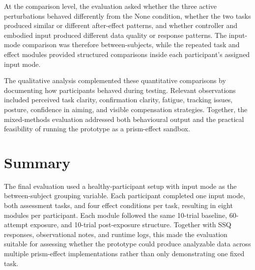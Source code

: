 At the comparison level, the evaluation asked whether the three active perturbations behaved differently from the None condition, whether the two tasks produced similar or different after-effect patterns, and whether controller and embodied input produced different data quality or response patterns. The input-mode comparison was therefore between-subjects, while the repeated task and effect modules provided structured comparisons inside each participant's assigned input mode.

The qualitative analysis complemented these quantitative comparisons by documenting how participants behaved during testing. Relevant observations included perceived task clarity, confirmation clarity, fatigue, tracking issues, posture, confidence in aiming, and visible compensation strategies. Together, the mixed-methods evaluation addressed both behavioural output and the practical feasibility of running the prototype as a prism-effect sandbox.

\section{Summary}
\label{sec:evaluation-summary}

The final evaluation used a healthy-participant setup with input mode as the between-subject grouping variable. Each participant completed one input mode, both assessment tasks, and four effect conditions per task, resulting in eight modules per participant. Each module followed the same 10-trial baseline, 60-attempt exposure, and 10-trial post-exposure structure. Together with SSQ responses, observational notes, and runtime logs, this made the evaluation suitable for assessing whether the prototype could produce analyzable data across multiple prism-effect implementations rather than only demonstrating one fixed task.
